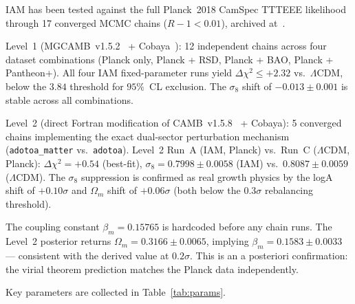 \documentclass[12pt,a4paper]{article}
\newcommand{\lcdm}{$\Lambda$CDM}
\newcommand{\Dchi}{\Delta\chi^2}
\begin{document}
IAM has been tested against the full Planck~2018 CamSpec TTTEEE likelihood
through 17 converged MCMC chains ($R-1 < 0.01$), archived
at~\citet{Mahaffey2026preprint}.

Level~1 (MGCAMB~v1.5.2~\citep{mgcamb} + Cobaya~\citep{cobaya}):
12 independent chains across four dataset combinations
(Planck only, Planck + RSD, Planck + BAO, Planck + Pantheon+).
All four IAM fixed-parameter runs yield $\Dchi \leq +2.32$ vs.\ \lcdm,
below the $3.84$ threshold for $95\%$~CL exclusion.
The $\sigma_8$ shift of $-0.013 \pm 0.001$ is stable across all
combinations.

Level~2 (direct Fortran modification of CAMB~v1.5.8~\citep{Lewis2011camb}
+ Cobaya):
5 converged chains implementing the exact dual-sector perturbation
mechanism (\texttt{adotoa\_matter} vs.\ \texttt{adotoa}).
Level~2 Run~A (IAM, Planck) vs.\ Run~C (\lcdm, Planck):
$\Dchi = +0.54$ (best-fit), $\sigma_8 = 0.7998 \pm 0.0058$ (IAM)
vs.\ $0.8087 \pm 0.0059$ (\lcdm{}).
The $\sigma_8$ suppression is confirmed as real growth physics by the
logA shift of $+0.10\sigma$ and $\Omega_m$ shift of $+0.06\sigma$
(both below the $0.3\sigma$ rebalancing threshold).

The coupling constant $\beta_m = 0.15765$ is hardcoded before any chain
runs.
The Level~2 posterior returns $\Omega_m = 0.3166 \pm 0.0065$, implying
$\beta_m = 0.1583 \pm 0.0033$ --- consistent with the derived value at
$0.2\sigma$.
This is an a posteriori confirmation: the virial theorem prediction
matches the Planck data independently.

Key parameters are collected in Table~\ref{tab:params}.
\end{document}
